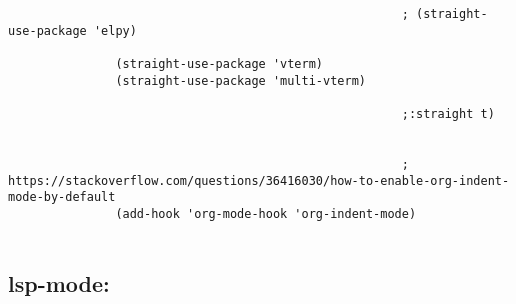 \documentclass[11pt]{article}
\begin{document}
\begin{verbatim}
                                                       ; (straight-use-package 'elpy)

               (straight-use-package 'vterm)
               (straight-use-package 'multi-vterm)

                                                       ;:straight t)


                                                       ; https://stackoverflow.com/questions/36416030/how-to-enable-org-indent-mode-by-default 
               (add-hook 'org-mode-hook 'org-indent-mode) 


\end{verbatim}




\subsection{lsp-mode:}
\label{sec:orgdf78486}
\end{document}
